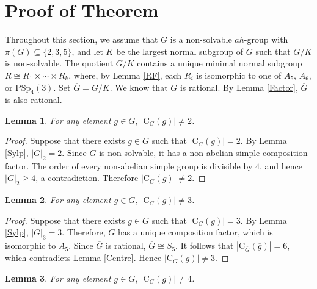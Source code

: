 \documentclass[11pt]{article}
\providecommand{\PSp}{{\mathrm{PSp}}}
\providecommand{\C}{{\mathrm{C}}}
\providecommand{\olg}{{\overline{g}}}
\providecommand{\olG}{{\overline{G}}}
\newtheorem{lem}{Lemma}
\begin{document}
\section{Proof of Theorem}



    Throughout this section, 
    we assume that $G$ is a non-solvable $ah$-group with $\pi(G) \subseteq \{2,3,5\}$,
    and let $K$ be the largest normal subgroup of $G$ such that $G/K$ is non-solvable. The quotient $G/K$ contains a unique minimal normal subgroup 
    $R \cong R_1 \times \cdots \times R_k$, 
    where, by Lemma \ref{RF}, each $R_i$ is isomorphic to one of
    $A_5$, $A_6$, or $\PSp_4(3)$. 
    Set $\olG=G/K$.
    We know that $G$ is rational. 
    By Lemma \ref{Factor}, $\olG$ is also rational.


\begin{lem}
    For any element $g\in G$, $|\C_G(g)|\neq 2$. 
\end{lem}

\begin{proof}
     Suppose that there exists $g \in G$ such that $|\C_G(g)| = 2$.
     By Lemma \ref{Sylp}, $|G|_2 =2 $.
     Since $G$ is non-solvable, it has a non-abelian simple composition factor. 
     The order of every non-abelian simple group is divisible by $4$, 
     and hence $|G|_2\geq 4$, a contradiction.
     Therefore $|\C_G(g)|\neq 2$.
\end{proof}



\begin{lem}
    For any element $g\in G$, $|\C_G(g)|\neq 3$. 
\end{lem}

\begin{proof}
    Suppose that there exists $g \in G$ such that $|\C_G(g)| = 3$. 
    By Lemma \ref{Sylp}, $|G|_3 = 3$. 
    Therefore, $G$ has a unique composition factor, which is isomorphic to $A_5$. 
    Since $\olG$ is rational, $\olG \cong S_5$.
    It follows that $|\C_{\olG}(\olg)|=6$, which contradicts Lemma \ref{Centre}.
    Hence $|\C_G(g)|\neq 3$.
\end{proof}

\begin{lem}
    For any element $g \in G$, $|\C_G(g)| \neq 4$.
\end{lem}
\end{document}
